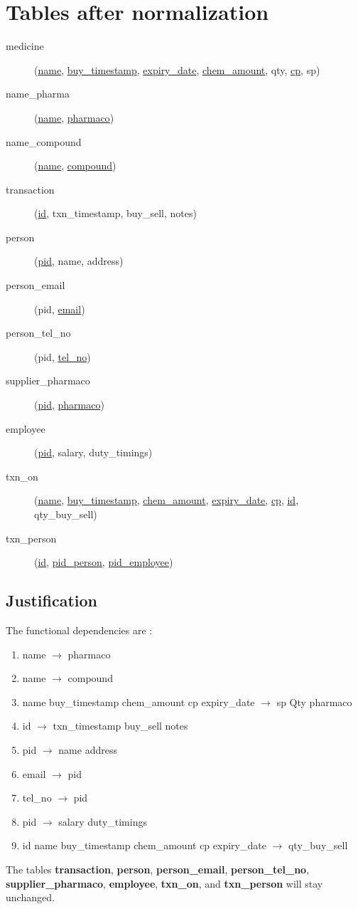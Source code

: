 \documentclass[a4papaer]{article}
\begin{document}
\section{Tables after normalization}
	\begin{description}
		\item[medicine] (\underline{name}, \underline{buy\_timestamp}, \underline{expiry\_date}, \underline{chem\_amount}, qty, \underline{cp}, sp)
		\item[name\_pharma] (\underline{name}, \underline{pharmaco})
		\item[name\_compound] (\underline{name}, \underline{compound})
		\item[transaction] (\underline{id}, txn\_timestamp, buy\_sell, notes)
		\item[person] (\underline{pid}, name, address)
		\item[person\_email] (pid, \underline{email})
		\item[person\_tel\_no] (pid, \underline{tel\_no})
		\item[supplier\_pharmaco] (\underline{pid}, \underline{pharmaco})
		\item[employee] (\underline{pid}, salary, duty\_timings)
		\item[txn\_on] (\underline{name}, \underline{buy\_timestamp}, \underline{chem\_amount}, \underline{expiry\_date}, \underline{cp}, \underline{id}, qty\_buy\_sell)
		\item[txn\_person] (\underline{id}, \underline{pid\_person}, \underline{pid\_employee})
	\end{description}

	\subsection{Justification}
		The functional dependencies are :\\
			\begin{enumerate}
				\item name $\rightarrow$ pharmaco
				\item name $\rightarrow$ compound
				\item name buy\_timestamp chem\_amount cp expiry\_date $\rightarrow$ sp Qty pharmaco
				\item id $\rightarrow$ txn\_timestamp buy\_sell notes
				\item pid $\rightarrow$ name address
				\item email $\rightarrow$ pid
				\item tel\_no $\rightarrow$ pid
				\item pid $\rightarrow$ salary duty\_timings
				\item id name buy\_timestamp chem\_amount cp expiry\_date $\rightarrow$ qty\_buy\_sell
			\end{enumerate}
		The tables {\bf transaction}, {\bf person}, {\bf person\_email}, {\bf person\_tel\_no}, {\bf supplier\_pharmaco}, {\bf employee}, {\bf txn\_on}, and {\bf txn\_person} will stay unchanged. \\
		
\end{document}
